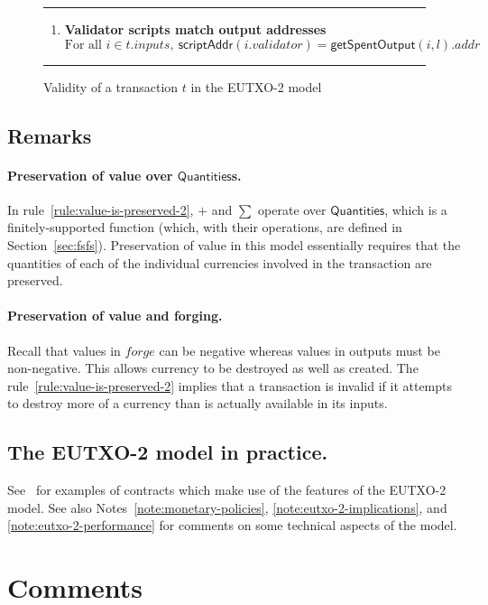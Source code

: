 \documentclass[a4paper]{article}
\newcounter{note}
\newcommand{\s}{\textsf}  %
\newcommand{\msf}[1]{\ensuremath{\mathsf{#1}}}
\newcommand{\mi}[1]{\ensuremath{\mathit{#1}}}
\newcommand\rfskip{7pt}
\newenvironment{ruledfigure}[1]{\begin{figure}[#1]\hrule\vspace{\rfskip}}{\vspace{\rfskip}\hrule\end{figure}}
\newcommand{\scriptAddr}{\msf{scriptAddr}}
\newcommand{\inputs}{\mi{inputs}}
\newcommand{\forge}{\mi{forge}}
\newcommand{\addr}{\mi{addr}}
\newcommand{\validator}{\mi{validator}}
\newcommand{\getSpent}{\msf{getSpentOutput}}
\newcommand{\qtymap}{\ensuremath{\s{Quantities}}}
\begin{document}
\begin{ruledfigure}{H}
\begin{enumerate}
\item
  \label{rule:validator-scripts-hash-2}
  \textbf{Validator scripts match output addresses}
  \begin{displaymath}
    \textrm{For all } i \in t.\inputs,\ \scriptAddr(i.\validator) = \getSpent(i, l).\addr
  \end{displaymath}

\end{enumerate}
\caption{Validity of a transaction $t$ in the EUTXO-2 model}
\label{fig:eutxo-2-validity}
\end{ruledfigure}

\subsection{Remarks}
\paragraph{Preservation of value over \qtymap{}s.}
In rule~\ref{rule:value-is-preserved-2},
$+$ and $\sum$ operate over \qtymap{}, which is
a finitely-supported function (which, with their operations,
are defined in Section~\ref{sec:fsfs}). Preservation of value
in this model essentially requires that the
quantities of each of the individual currencies involved in the
transaction are preserved.

\paragraph{Preservation of value and forging.}
Recall that values in $\forge$ can
be negative whereas values in outputs must be non-negative. This allows
currency to be destroyed as well as created. The
rule~\ref{rule:value-is-preserved-2} implies that a
transaction is invalid if it attempts to destroy more of a currency
than is actually available in its inputs.

\subsection{The EUTXO-2 model in practice.}
See~\cite{Plutus-book} for examples of contracts which make use of the
features of the EUTXO-2 model.  See also
Notes~\ref{note:monetary-policies}, \ref{note:eutxo-2-implications},
and \ref{note:eutxo-2-performance} for comments on some technical
aspects of the model.

\appendix
\section{Comments}
\label{appendix:comments}
\end{document}
